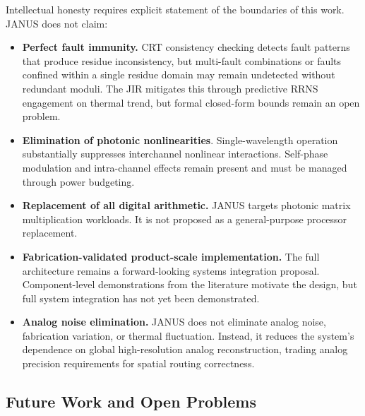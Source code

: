 \documentclass[journal]{IEEEtran}
\begin{document}
Intellectual honesty requires explicit statement of the boundaries of this work. JANUS does not claim:
\begin{itemize}
\item  \textbf{Perfect fault immunity.} CRT consistency checking detects fault patterns that produce residue inconsistency, but multi-fault combinations or faults confined within a single residue domain may remain undetected without redundant moduli. The JIR mitigates this through predictive RRNS engagement on thermal trend, but formal closed-form bounds remain an open problem.
\item  \textbf{Elimination of photonic nonlinearities}. Single-wavelength operation substantially suppresses interchannel nonlinear interactions. Self-phase modulation and intra-channel effects remain present and must be managed through power budgeting.
\item  \textbf{Replacement of all digital arithmetic.} JANUS targets photonic matrix multiplication workloads. It is not proposed as a general-purpose processor replacement.
\item  \textbf{Fabrication-validated product-scale implementation.} The full architecture remains a forward-looking systems integration proposal. Component-level demonstrations from the literature motivate the design, but full system integration has not yet been demonstrated.
\item  \textbf{Analog noise elimination.} JANUS does not eliminate analog noise, fabrication variation, or thermal fluctuation. Instead, it reduces the system’s dependence on global high-resolution analog reconstruction, trading analog precision requirements for spatial routing correctness.
\end{itemize}

\subsection{\textbf{Future Work and Open Problems}}
\end{document}
